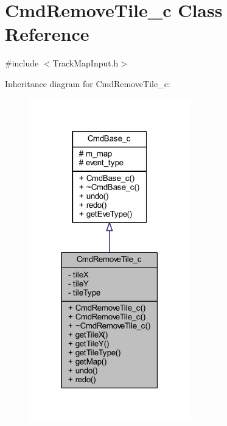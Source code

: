 \hypertarget{class_cmd_remove_tile__c}{\section{Cmd\+Remove\+Tile\+\_\+c Class Reference}
\label{class_cmd_remove_tile__c}
}


{\ttfamily \#include $<$Track\+Map\+Input.\+h$>$}



Inheritance diagram for Cmd\+Remove\+Tile\+\_\+c\+:
\nopagebreak
\begin{figure}[H]
\begin{center}
\leavevmode
\includegraphics[width=198pt]{class_cmd_remove_tile__c__inherit__graph}
\end{center}
\end{figure}


